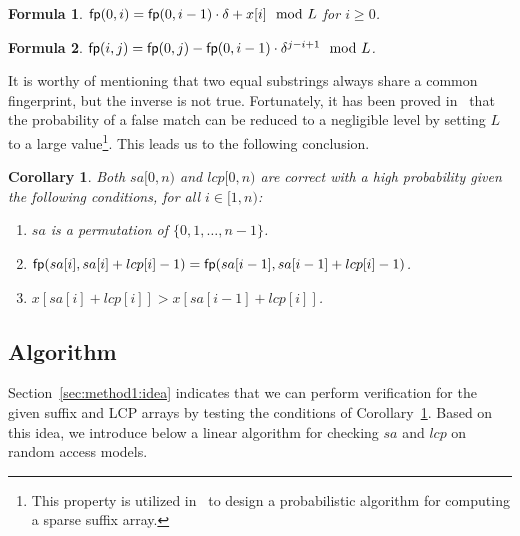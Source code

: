 \documentclass[10pt,journal,compsoc]{IEEEtran}
\newtheorem{Formula}{Formula}
\newtheorem{Corollary}{Corollary}
\begin{document}
\begin{Formula} \label{formula:2}	
	${\sf fp}(0, i) = {\sf fp}(0, i - 1) \cdot {\delta} + x[i]\mod L$ for $i \ge 0$.
	
\end{Formula}

\begin{Formula} \label{formula:3}
	${\sf fp}(i, j) = {\sf fp}(0, j) - {\sf fp}(0 ,i - 1) \cdot {\delta}^{j - i + 1}\mod L$.
	
\end{Formula}

It is worthy of mentioning that two equal substrings always share a common fingerprint, but the inverse is not true. Fortunately, it has been proved in~\cite{Karp1987} that the probability of a false match can be reduced to a negligible level by setting $L$ to a large value\footnote{This property is utilized in~\cite{Bille2013} to design a probabilistic algorithm for computing a sparse suffix array. }. This leads us to the following conclusion.

\begin{Corollary} \label{corollary:1}
	Both $sa[0, n)$ and $lcp[0, n)$ are correct with a high probability given the following conditions, for all $i \in [1, n)$:
	
	\begin{enumerate}[(1)]
		\item
		$sa$ is a permutation of $\{0, 1, \dots, n - 1\}$.
		
		\item
		${\sf fp}(sa[i], sa[i] + lcp[i] - 1) = {\sf fp}(sa[i - 1], sa[i - 1] + lcp[i] - 1)$.
		
		\item
		$x[sa[i] + lcp[i]] > x[sa[i - 1] + lcp[i]]$.
	\end{enumerate}
\end{Corollary}


\subsection{Algorithm} \label{sec:method1:algorithm}

Section~\ref{sec:method1:idea} indicates that we can perform verification for the given suffix and LCP arrays by testing the conditions of Corollary~\ref{corollary:1}. Based on this idea, we introduce below a linear algorithm for checking $sa$ and $lcp$ on random access models.
\end{document}
